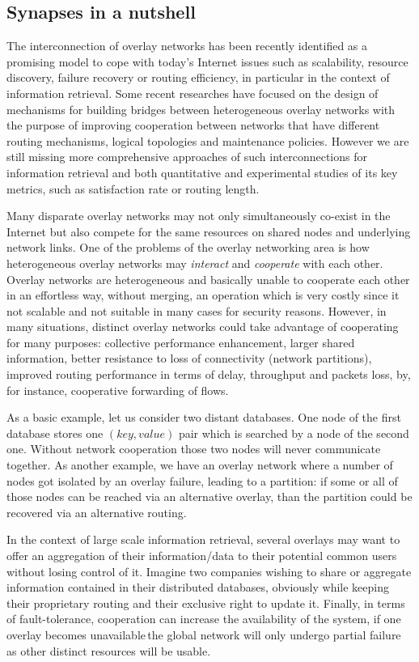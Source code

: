 \subsection{Synapses in a nutshell}
%
The interconnection of overlay networks has been recently identified
as a promising model to cope with today's Internet issues such as
scalability, resource discovery, failure recovery or routing
efficiency, in particular in the context of information retrieval.
Some recent researches have focused on the design of mechanisms for
building bridges between heterogeneous overlay networks with the
purpose of improving cooperation between networks that have different
routing mechanisms, logical topologies and maintenance
policies. However we are still missing  more comprehensive approaches of such
interconnections for information retrieval and both quantitative and
experimental studies of its key metrics, such as satisfaction rate or
routing length.

Many disparate overlay networks may not only simultaneously co-exist
in the Internet but also compete for the same resources on shared
nodes and underlying network links. One of the problems of the overlay
networking area is how heterogeneous overlay networks may
\emph{interact} and \emph{cooperate} with each other. Overlay networks
are heterogeneous and basically unable to cooperate each other in an
effortless way, without merging, an operation which is very costly
since it not scalable and not suitable in many cases for security
reasons. However, in many situations, distinct overlay networks could
take advantage of cooperating for many purposes: collective
performance enhancement, larger shared information, better resistance
to loss of connectivity (network partitions), improved routing
performance in terms of delay, throughput and packets loss, by, for
instance, cooperative forwarding of flows.

As a basic example, let us consider two distant databases. One node of
the first database stores one $(key, value)$ pair which is searched by
a node of the second one. Without network cooperation those two nodes
will never communicate together. As another example, we have an
overlay network where a number of nodes got isolated by an overlay
failure, leading to a partition: if some or all of those nodes can be
reached via an alternative overlay, than the partition could be
recovered via an alternative routing.

In the context of large scale information retrieval, several overlays
may want to offer an aggregation of their information/data to their
potential common users without losing control of it.  Imagine two
companies wishing to share or aggregate information contained in their
distributed databases, obviously while keeping their proprietary
routing and their exclusive right to update it.  Finally, in terms of
fault-tolerance, cooperation can increase the availability of the
system, if one overlay becomes unavailable\,the global network will
only undergo partial failure as other distinct resources will be
usable.

